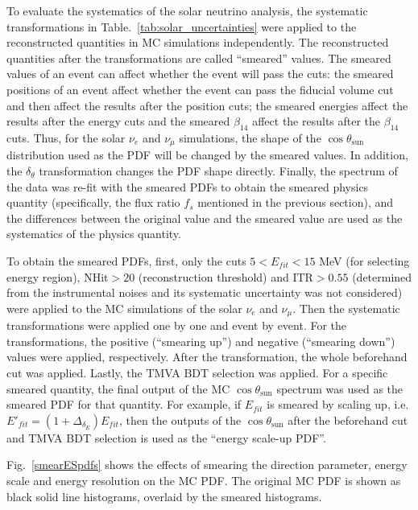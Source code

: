 To evaluate the systematics of the solar neutrino analysis, the systematic transformations in Table.~\ref{tab:solar_uncertainties} were applied to the reconstructed quantities in MC simulations independently. The reconstructed quantities after the transformations are called ``smeared'' values. The smeared values of an event can affect whether the event will pass the cuts: the smeared positions of an event affect whether the event can pass the fiducial volume cut and then affect the results after the position cuts; the smeared energies affect the results after the energy cuts and the smeared $\beta_{14}$ affect the results after the $\beta_{14}$ cuts. Thus, for the solar $\nu_e$ and $\nu_\mu$ simulations, the shape of the $\cos\theta_\mathrm{sun}$ distribution used as the PDF will be changed by the smeared values. In addition, the $\delta_\theta$ transformation changes the PDF shape directly. Finally, the spectrum of the data was re-fit with the smeared PDFs to obtain the smeared physics quantity (specifically, the flux ratio $f_s$ mentioned in the previous section), and the differences between the original value and the smeared value are used as the systematics of the physics quantity.

To obtain the smeared PDFs, first, only the cuts $5<E_{fit}<15$ MeV (for selecting energy region), NHit$>20$ (reconstruction threshold) and $\mathrm{ITR}>0.55$ (determined from the instrumental noises and its systematic uncertainty was not considered) were applied to the MC simulations of the solar $\nu_e$ and $\nu_\mu$. Then the systematic transformations were applied one by one and event by event. For the transformations, the positive (``smearing up'') and negative (``smearing down'') values were applied, respectively. After the transformation, the whole beforehand cut was applied. Lastly, the TMVA BDT selection was applied. For a specific smeared quantity, the final output of the MC $\cos\theta_\mathrm{sun}$ spectrum was used as the smeared PDF for that quantity. For example, if $E_{fit}$ is smeared by scaling up, i.e. $E'_{fit}=(1+\Delta_{\delta_E})E_{fit}$, then the outputs of the $\cos\theta_\mathrm{sun}$ after the beforehand cut and TMVA BDT selection is used as the ``energy scale-up PDF''.

Fig.~\ref{smearESpdfs} shows the effects of smearing the direction parameter, energy scale and energy resolution on the MC PDF. The original MC PDF is shown as black solid line histograms, overlaid by the smeared histograms.

